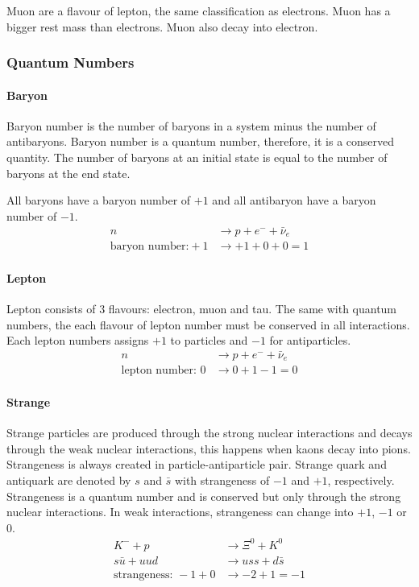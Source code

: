 \documentclass[10pt]{article}
\begin{document}
\begin{multicols}{2}
	Muon are a flavour of lepton, the same classification as electrons. Muon has a
	bigger rest mass than electrons. Muon also decay into electron.

	\subsubsection{Quantum Numbers}
	\paragraph{Baryon}
	Baryon number is the number of baryons in a system minus the number of
	antibaryons. Baryon number is a quantum number, therefore, it is a conserved
	quantity. The number of baryons at an initial state is equal to the number of
	baryons at the end state.
	\medskip

	All baryons have a baryon number of $+1$ and all antibaryon have a baryon number
	of $-1$.
	\begin{align*}
		n                        & \longrightarrow p + e^- +\bar{\nu}_e \\
		\text{baryon number:} +1 & \longrightarrow +1 +0 +0 = 1
	\end{align*}

	\paragraph{Lepton}
	Lepton consists of 3 flavours: electron, muon and tau. The same with quantum
	numbers, the each flavour of lepton number must be conserved in all
	interactions. Each lepton numbers assigns $+1$ to particles and $-1$ for
	antiparticles.
	\begin{align*}
		n                        & \longrightarrow p + e^- +\bar{\nu}_e \\
		\text{lepton number: } 0 & \longrightarrow 0 + 1 - 1 = 0
	\end{align*}

	\paragraph{Strange}
	Strange particles are produced through the strong nuclear interactions and
	decays through the weak nuclear interactions, this happens when kaons
	decay into pions. Strangeness is always created in particle-antiparticle pair.
	Strange quark and antiquark are denoted by $s$ and $\bar{s}$ with strangeness of
	$-1$ and $+1$, respectively. Strangeness is a quantum number and is conserved
	but only through the strong nuclear interactions. In weak interactions,
	strangeness can change into $+1$, $-1$ or $0$.
	\begin{align*}
		K^- + p                     & \longrightarrow \Xi^0 + K^0    \\
		s\bar{u} + uud              & \longrightarrow uss + d\bar{s} \\
		\text{strangeness: } -1 + 0 & \longrightarrow -2 + 1 = -1
	\end{align*}


\end{multicols}
\end{document}
